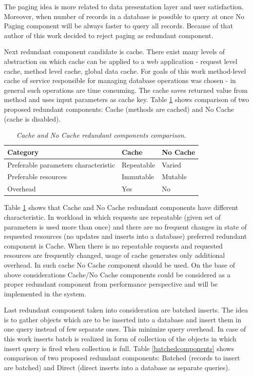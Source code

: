 \documentclass[10pt,a4paper]{article}
\begin{document}
The paging idea is more related to data presentation layer and user satisfaction. Moreover, when number of records in a database is possible to query at once No Paging component will be always faster to query all records. Because of that author of this work decided to reject paging as redundant component. 

Next redundant component candidate is cache. There exist many levels of abstraction on which cache can be applied to a web application - request level cache, method level cache, global data cache. For goals of this work method-level cache of service responsible for managing database operations was chosen - in general such operations are time consuming. The cache saves returned value from method and uses input parameters as cache key. Table \ref{cachecomponents} shows comparison of two proposed redundant components: Cache (methods are cached) and No Cache (cache is disabled).
\begin{table}[!htb]
\def\arraystretch{1.5}
\caption{\textit{Cache and No Cache redundant components comparison.}}\label{cachecomponents}
\begin{tabularx}{\textwidth}{p{6cm}|X|X}
  \textbf{Category} &\textbf{Cache} & \textbf{No Cache} \\
\hline
Preferable parameters characteristic & Repeatable & Varied \\
Preferable resources & Immutable & Mutable\\
Overhead & Yes & No\\
\end{tabularx}
\end{table}
 
Table \ref{cachecomponents} shows that Cache and No Cache redundant components have different characteristic. In workload in which requests are repeatable (given set of parameters is used more than once) and there are no frequent changes in state of requested resources (no updates and inserts into a database) preferred redundant component is Cache. When there is no repeatable requests and requested resources are frequently changed, usage of cache generates only additional overhead. In such cache No Cache component should be used. On the base of above considerations Cache/No Cache components could be considered as a proper redundant component from performance perspective and will be implemented in the system. 

Last redundant component taken into consideration are batched inserts. The idea is to gather objects which are to be inserted into a database and insert them in one query instead of few separate ones. This minimize query overhead. In case of this work inserts batch is realized in form of collection of the objects in which insert query is fired when collection is full.   
Table \ref{batchedcomponents} shows comparison of two proposed redundant components: Batched (records to insert are batched) and Direct (direct inserts into a database as separate queries).
\end{document}
